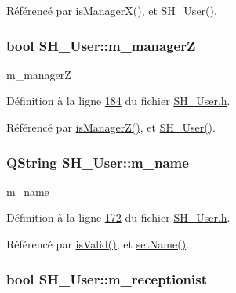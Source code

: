 Référencé par \hyperlink{classSH__User_ac69553a66b8c7177c9a5e28a64f02d48}{is\-Manager\-X()}, et \hyperlink{classSH__User_a96c0ebb3f11c1654935aaecb92295724}{S\-H\-\_\-\-User()}.

\hypertarget{classSH__User_aff16f3d1a135c4b6673b69c42cffe86d}{
\subsubsection[{m\-\_\-manager\-Z}]{\setlength{\rightskip}{0pt plus 5cm}bool S\-H\-\_\-\-User\-::m\-\_\-manager\-Z\hspace{0.3cm}{\ttfamily [private]}}}\label{classSH__User_aff16f3d1a135c4b6673b69c42cffe86d}


m\-\_\-manager\-Z 



Définition à la ligne \hyperlink{SH__User_8h_source_l00184}{184} du fichier \hyperlink{SH__User_8h_source}{S\-H\-\_\-\-User.\-h}.



Référencé par \hyperlink{classSH__User_aa59c59a6f538628c883216e4a73e4c75}{is\-Manager\-Z()}, et \hyperlink{classSH__User_a96c0ebb3f11c1654935aaecb92295724}{S\-H\-\_\-\-User()}.

\hypertarget{classSH__User_abaf53f509224bdd7f8224259bffea2d6}{
\subsubsection[{m\-\_\-name}]{\setlength{\rightskip}{0pt plus 5cm}Q\-String S\-H\-\_\-\-User\-::m\-\_\-name\hspace{0.3cm}{\ttfamily [private]}}}\label{classSH__User_abaf53f509224bdd7f8224259bffea2d6}


m\-\_\-name 



Définition à la ligne \hyperlink{SH__User_8h_source_l00172}{172} du fichier \hyperlink{SH__User_8h_source}{S\-H\-\_\-\-User.\-h}.



Référencé par \hyperlink{classSH__User_aa1b7fd66632c13905f3b6fd941505c02}{is\-Valid()}, et \hyperlink{classSH__User_ae35f21797b53378ad2a6e5e6389bb8c8}{set\-Name()}.

\hypertarget{classSH__User_a86a5f8feb41c4238c5f022e9fbbe2e44}{
\subsubsection[{m\-\_\-receptionist}]{\setlength{\rightskip}{0pt plus 5cm}bool S\-H\-\_\-\-User\-::m\-\_\-receptionist\hspace{0.3cm}{\ttfamily [private]}}}\label{classSH__User_a86a5f8feb41c4238c5f022e9fbbe2e44}


